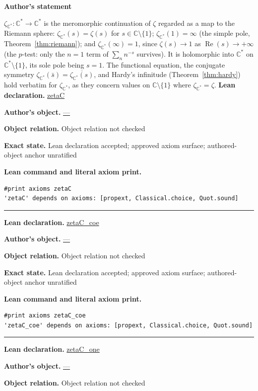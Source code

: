\documentclass[11pt]{article}
\newcommand{\CC}{\mathbb{C}}
\newcommand{\Cstar}{\CC^{*}}
\newcommand{\zetaC}{\zeta_{\Cstar}}
\DeclareMathOperator{\re}{Re}
\theoremstyle{plain}
\theoremstyle{definition}
\theoremstyle{remark}
\begin{document}
\begin{tcolorbox}[provenancecard,title={6. Definition - Compactified classical zeta},title after break={6. Definition - Compactified classical zeta (continued)}]
\textbf{Author's statement}\par
$\zetaC:\Cstar\to\Cstar$ is the meromorphic continuation of $\zeta$ regarded as a map to
the Riemann sphere: $\zetaC(s)=\zeta(s)$ for $s\in\CC\setminus\{1\}$; $\zetaC(1)=\infty$
(the simple pole, Theorem~\ref{thm:riemann}); and $\zetaC(\infty)=1$, since
$\zeta(s)\to1$ as $\re(s)\to+\infty$ (the $p$-test: only the $n=1$ term of
$\sum_n n^{-s}$ survives). It is holomorphic into $\Cstar$ on $\Cstar\setminus\{1\}$,
its sole pole being $s=1$. The functional equation, the conjugate symmetry
$\zetaC(\bar s)=\overline{\zetaC(s)}$, and Hardy's infinitude (Theorem~\ref{thm:hardy}) hold
verbatim for $\zetaC$, as they concern values on $\CC\setminus\{1\}$ where $\zetaC=\zeta$.
\tcblower
\textbf{Lean declaration.} \url{zetaC}
\par\textbf{Author's object.} \url{—}
\par\textbf{Object relation.} Object relation not checked
\par\textbf{Exact state.} Lean declaration accepted; approved axiom surface; authored-object anchor unratified
\par\smallskip\textbf{Lean command and literal axiom print.}
\begin{Verbatim}[breaklines=true,breakanywhere=true,fontsize=\small]
#print axioms zetaC
'zetaC' depends on axioms: [propext, Classical.choice, Quot.sound]
\end{Verbatim}
\medskip\hrule\medskip
\textbf{Lean declaration.} \url{zetaC_coe}
\par\textbf{Author's object.} \url{—}
\par\textbf{Object relation.} Object relation not checked
\par\textbf{Exact state.} Lean declaration accepted; approved axiom surface; authored-object anchor unratified
\par\smallskip\textbf{Lean command and literal axiom print.}
\begin{Verbatim}[breaklines=true,breakanywhere=true,fontsize=\small]
#print axioms zetaC_coe
'zetaC_coe' depends on axioms: [propext, Classical.choice, Quot.sound]
\end{Verbatim}
\medskip\hrule\medskip
\textbf{Lean declaration.} \url{zetaC_one}
\par\textbf{Author's object.} \url{—}
\par\textbf{Object relation.} Object relation not checked

\end{tcolorbox}
\end{document}
